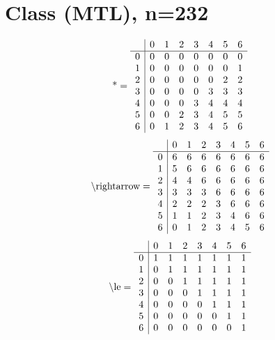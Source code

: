 \documentclass[11pt]{article}
\begin{document}
\section{Class (MTL), n=232}
\[\text{*} = 
\begin{array}{r | r r r r r r r}
 & 0 & 1 & 2 & 3 & 4 & 5 & 6 \\ \hline
0 & 0 & 0 & 0 & 0 & 0 & 0 & 0 \\
1 & 0 & 0 & 0 & 0 & 0 & 0 & 1 \\
2 & 0 & 0 & 0 & 0 & 0 & 2 & 2 \\
3 & 0 & 0 & 0 & 0 & 3 & 3 & 3 \\
4 & 0 & 0 & 0 & 3 & 4 & 4 & 4 \\
5 & 0 & 0 & 2 & 3 & 4 & 5 & 5 \\
6 & 0 & 1 & 2 & 3 & 4 & 5 & 6 \\
\end{array}
\]
\[\text{\textbackslash rightarrow} = 
\begin{array}{r | r r r r r r r}
 & 0 & 1 & 2 & 3 & 4 & 5 & 6 \\ \hline
0 & 6 & 6 & 6 & 6 & 6 & 6 & 6 \\
1 & 5 & 6 & 6 & 6 & 6 & 6 & 6 \\
2 & 4 & 4 & 6 & 6 & 6 & 6 & 6 \\
3 & 3 & 3 & 3 & 6 & 6 & 6 & 6 \\
4 & 2 & 2 & 2 & 3 & 6 & 6 & 6 \\
5 & 1 & 1 & 2 & 3 & 4 & 6 & 6 \\
6 & 0 & 1 & 2 & 3 & 4 & 5 & 6 \\
\end{array}
\]
\[\text{\textbackslash le} = 
\begin{array}{r | r r r r r r r}
 & 0 & 1 & 2 & 3 & 4 & 5 & 6 \\ \hline
0 & 1 & 1 & 1 & 1 & 1 & 1 & 1 \\
1 & 0 & 1 & 1 & 1 & 1 & 1 & 1 \\
2 & 0 & 0 & 1 & 1 & 1 & 1 & 1 \\
3 & 0 & 0 & 0 & 1 & 1 & 1 & 1 \\
4 & 0 & 0 & 0 & 0 & 1 & 1 & 1 \\
5 & 0 & 0 & 0 & 0 & 0 & 1 & 1 \\
6 & 0 & 0 & 0 & 0 & 0 & 0 & 1 \\
\end{array}
\]
\end{document}
